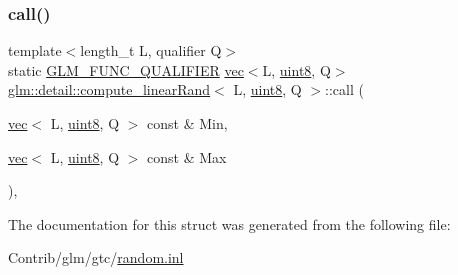 \subsubsection{\texorpdfstring{call()}{call()}}
{\footnotesize\ttfamily template$<$length\+\_\+t L, qualifier Q$>$ \\
static \mbox{\hyperlink{setup_8hpp_a33fdea6f91c5f834105f7415e2a64407}{G\+L\+M\+\_\+\+F\+U\+N\+C\+\_\+\+Q\+U\+A\+L\+I\+F\+I\+ER}} \mbox{\hyperlink{structglm_1_1vec}{vec}}$<$L, \mbox{\hyperlink{namespaceglm_1_1detail_aef2588f97d090cc19fbbe0c74fe17c8f}{uint8}}, Q$>$ \mbox{\hyperlink{structglm_1_1detail_1_1compute__linear_rand}{glm\+::detail\+::compute\+\_\+linear\+Rand}}$<$ L, \mbox{\hyperlink{namespaceglm_1_1detail_aef2588f97d090cc19fbbe0c74fe17c8f}{uint8}}, Q $>$\+::call (\begin{DoxyParamCaption}\item[{\mbox{\hyperlink{structglm_1_1vec}{vec}}$<$ L, \mbox{\hyperlink{namespaceglm_1_1detail_aef2588f97d090cc19fbbe0c74fe17c8f}{uint8}}, Q $>$ const \&}]{Min,  }\item[{\mbox{\hyperlink{structglm_1_1vec}{vec}}$<$ L, \mbox{\hyperlink{namespaceglm_1_1detail_aef2588f97d090cc19fbbe0c74fe17c8f}{uint8}}, Q $>$ const \&}]{Max }\end{DoxyParamCaption})\hspace{0.3cm}{\ttfamily [inline]}, {\ttfamily [static]}}



The documentation for this struct was generated from the following file\+:\begin{DoxyCompactItemize}
\item 
Contrib/glm/gtc/\mbox{\hyperlink{random_8inl}{random.\+inl}}\end{DoxyCompactItemize}
